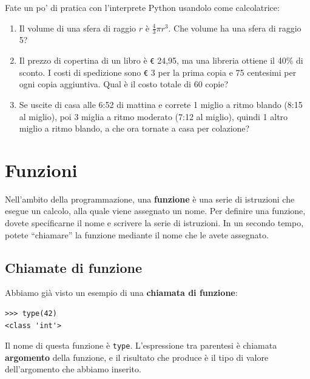 \documentclass[10pt]{book}
\begin{document}
\vspace{0.2in}
\begin{exercise}

Fate un po' di pratica con l'interprete Python usandolo come calcolatrice:

\begin{enumerate}

\item Il volume di una sfera di raggio $r$ è $\frac{4}{3} \pi r^3$.
  Che volume ha una sfera di raggio 5?

\item Il prezzo di copertina di un libro è \verb"€" 24,95, ma una libreria ottiene il 40\% di sconto. I costi di spedizione sono \verb"€" 3 per la prima copia e 75 centesimi per ogni copia aggiuntiva. Qual è il costo totale di 60 copie?

\item Se uscite di casa alle 6:52 di mattina e correte 1 miglio a ritmo blando (8:15 al miglio), poi 3 miglia a ritmo moderato (7:12 al miglio), quindi 1 altro miglio a ritmo blando, a che ora tornate a casa per colazione?

\end{enumerate}
\end{exercise}


\chapter{Funzioni}
\label{funcchap}

Nell'ambito della programmazione, una {\bf funzione} è una serie di istruzioni che esegue un calcolo, alla quale viene assegnato un nome.  Per definire una funzione, dovete specificarne il nome e scrivere la serie di istruzioni. In un secondo tempo, potete ``chiamare'' la funzione mediante il nome che le avete assegnato. 

\section{Chiamate di funzione}
\label{functionchap}

Abbiamo già visto un esempio di una {\bf chiamata di funzione}:

\begin{verbatim}
>>> type(42)
<class 'int'>
\end{verbatim}
%
Il nome di questa funzione è {\tt type}. L'espressione tra parentesi è chiamata {\bf argomento} della funzione, e il risultato che produce è il tipo di valore dell'argomento che abbiamo inserito.
\end{document}

